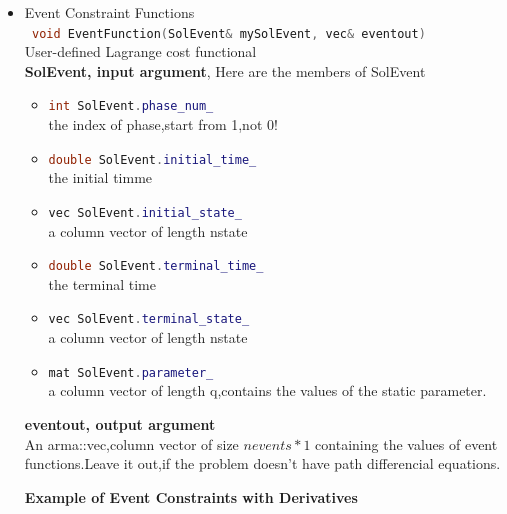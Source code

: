 \documentclass[10pt]{article}
\begin{document}
\begin{itemize}
\begin{frame}
\begin{lstlisting}
		 }
		 	\end{lstlisting}
		 \end{frame}
		\item Event Constraint Functions\\
		\lstinline[language=C++]| void EventFunction(SolEvent& mySolEvent, vec& eventout)|\\
		User-defined Lagrange cost functional\\
		\textbf{SolEvent, input argument}, Here are the members of SolEvent 
		\begin{itemize}
			\item \lstinline[language=C++]|int SolEvent.phase_num_|\\the index of phase,start from 1,not 0!
			\item \lstinline[language=C++]|double SolEvent.initial_time_|\\ the initial timme
			\item \lstinline[language=C++]|vec SolEvent.initial_state_|  \\ a column vector of length nstate
			\item \lstinline[language=C++]|double SolEvent.terminal_time_|\\the terminal time
			\item \lstinline[language=C++]|vec SolEvent.terminal_state_| \\ a column vector of length nstate
			\item \lstinline[language=C++]|mat SolEvent.parameter_| \\a column vector of length q,contains the values of the static parameter.
		\end{itemize}
		\textbf{eventout, output argument}\\
		An arma::vec,column vector of size $nevents*1$ containing the values of event functions.Leave it out,if the problem doesn't have path differencial equations.\\
		\begin{frame}
			{\noindent}{\bf Example of Event Constraints with Derivatives}
			

\end{frame}
\end{itemize}
\end{document}
